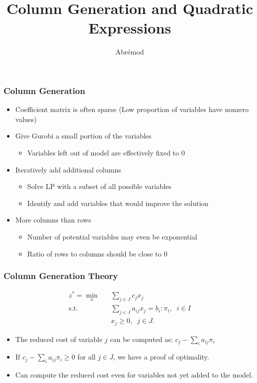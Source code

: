 \documentclass[12pt,handout]{beamer}
\title{Column Generation and Quadratic Expressions}
\author{Abr\'emod}
\begin{document}
\begin{frame}
\titlepage
\end{frame}

\begin{frame}
\frametitle{Column Generation}
\begin{itemize}
  \item Coefficient matrix is often sparse (Low proportion of variables have nonzero values)
  \item Give Gurobi a small portion of the variables
    \begin{itemize}
      \item Variables left out of model are effectively fixed to 0
    \end{itemize}
  \item Iteratively add additional columns
    \begin{itemize}
    \item Solve LP with a subset of all possible variables
    \item Identify and add variables that would improve the solution
    \end{itemize}      
    \item More columns than rows
    \begin{itemize}
      \item Number of potential variables may even be exponential
      \item Ratio of rows to columns should be close to 0
    \end{itemize}
\end{itemize}
\end{frame}

\begin{frame}
\frametitle{Column Generation Theory}
\begin{eqnarray}
z^* = \min_x && \sum_{j \in J} c_j x_j  \nonumber \\
\mbox{s.t.} && \sum_{j \in J} a_{ij} x_j  = b_i : \pi_i,\;\;i \in I \nonumber \\
&& x_j \ge 0,\;\;j \in J. \nonumber
\end{eqnarray}

\begin{itemize}
\item The reduced cost of variable $j$ can be computed as: $c_j - \sum_{i} a_{ij} \pi_i$
\item If $c_j - \sum_{i} a_{ij} \pi_i \ge 0$ for all $j \in J$, we have a proof of optimality.
\item Can compute the reduced cost even for variables not yet added to the model.
\end{itemize}
\end{frame}
\end{document}
